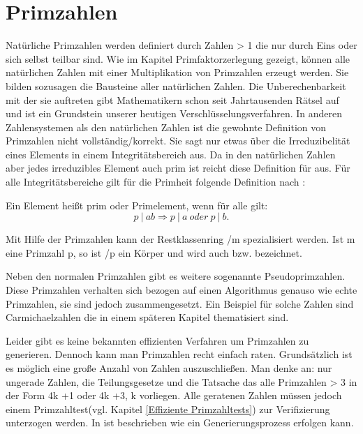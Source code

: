 \section{Primzahlen}
	Natürliche Primzahlen werden definiert durch Zahlen > 1 die nur durch Eins oder sich selbst teilbar sind. Wie im Kapitel Primfaktorzerlegung gezeigt, können alle natürlichen Zahlen mit einer Multiplikation von Primzahlen erzeugt werden. Sie bilden sozusagen die Bausteine aller natürlichen Zahlen. Die Unberechenbarkeit mit der sie auftreten gibt Mathematikern schon seit Jahrtausenden Rätsel auf und ist ein Grundstein unserer heutigen Verschlüsselungsverfahren.
	In anderen Zahlensystemen als den natürlichen Zahlen ist die gewohnte Definition von Primzahlen nicht vollständig/korrekt. Sie sagt nur etwas über die Irreduzibelität eines Elements in einem Integritätsbereich aus. Da in den natürlichen Zahlen aber jedes irreduzibles Element auch prim ist reicht diese Definition für  aus.
	Für alle Integritätsbereiche gilt für die Primheit folgende Definition nach \cite{Algorithmische:Zahlentheorie}:
	
	Ein Element  heißt prim oder Primelement, wenn für alle  gilt:	
	\begin{displaymath}
		p~|~ab \Longrightarrow p~|~a~oder~p~|~b.
	\end{displaymath}
		
	Mit Hilfe der Primzahlen kann der Restklassenring /m spezialisiert werden. Ist m eine Primzahl p, so ist /p ein Körper und wird auch  bzw.  bezeichnet.
	
	Neben den normalen Primzahlen gibt es weitere sogenannte Pseudoprimzahlen. Diese Primzahlen verhalten sich bezogen auf einen Algorithmus genauso wie echte Primzahlen, sie sind jedoch zusammengesetzt. Ein Beispiel für solche Zahlen sind Carmichaelzahlen die in einem späteren Kapitel thematisiert sind.

	Leider gibt es keine bekannten effizienten Verfahren um Primzahlen zu generieren. Dennoch kann man Primzahlen recht einfach raten. Grundsätzlich ist es möglich eine große Anzahl von Zahlen auszuschließen. Man denke an: nur ungerade Zahlen, die Teilungsgesetze und die Tatsache das alle Primzahlen > 3 in der Form 4k +1 oder 4k +3, k \myin {} vorliegen. Alle geratenen Zahlen müssen jedoch einem Primzahltest(vgl. Kapitel \ref{Effiziente Primzahltests}) zur Verifizierung unterzogen werden. In \cite{Algebraische:und:zahlentheoretische:Grundlagen:fuer:die:Informatik} ist beschrieben wie ein Generierungsprozess erfolgen kann.

